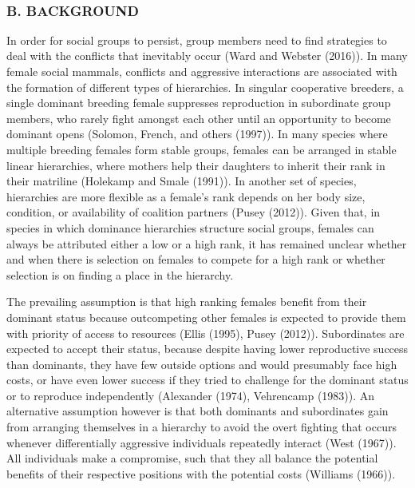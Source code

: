 \documentclass[]{article}
\begin{document}
~

\hypertarget{b.-background}{%
\subsubsection{B. BACKGROUND}\label{b.-background}}

In order for social groups to persist, group members need to find
strategies to deal with the conflicts that inevitably occur (Ward and
Webster (2016)). In many female social mammals, conflicts and aggressive
interactions are associated with the formation of different types of
hierarchies. In singular cooperative breeders, a single dominant
breeding female suppresses reproduction in subordinate group members,
who rarely fight amongst each other until an opportunity to become
dominant opens (Solomon, French, and others (1997)). In many species
where multiple breeding females form stable groups, females can be
arranged in stable linear hierarchies, where mothers help their
daughters to inherit their rank in their matriline (Holekamp and Smale
(1991)). In another set of species, hierarchies are more flexible as a
female's rank depends on her body size, condition, or availability of
coalition partners (Pusey (2012)). Given that, in species in which
dominance hierarchies structure social groups, females can always be
attributed either a low or a high rank, it has remained unclear whether
and when there is selection on females to compete for a high rank or
whether selection is on finding a place in the hierarchy.

The prevailing assumption is that high ranking females benefit from
their dominant status because outcompeting other females is expected to
provide them with priority of access to resources (Ellis (1995), Pusey
(2012)). Subordinates are expected to accept their status, because
despite having lower reproductive success than dominants, they have few
outside options and would presumably face high costs, or have even lower
success if they tried to challenge for the dominant status or to
reproduce independently (Alexander (1974), Vehrencamp (1983)). An
alternative assumption however is that both dominants and subordinates
gain from arranging themselves in a hierarchy to avoid the overt
fighting that occurs whenever differentially aggressive individuals
repeatedly interact (West (1967)). All individuals make a compromise,
such that they all balance the potential benefits of their respective
positions with the potential costs (Williams (1966)).
\end{document}
